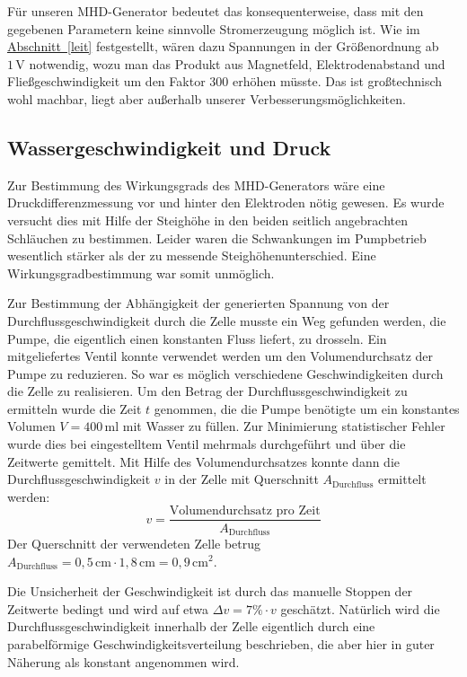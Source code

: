 \documentclass[11pt]{scrartcl}
\newcommand{\unit}[1]{\ensuremath{\,\mathrm{#1}}} %
\begin{document}
Für unseren MHD-Generator bedeutet das konsequenterweise, dass mit den gegebenen Parametern keine sinnvolle Stromerzeugung möglich ist. Wie im \hyperref[leit]{Abschnitt~\ref{leit}} festgestellt, wären dazu Spannungen in der Größenordnung ab $1\unit{V}$ notwendig, wozu man das Produkt aus Magnetfeld, Elektrodenabstand und Fließgeschwindigkeit um den Faktor 300 erhöhen müsste. Das ist großtechnisch wohl machbar, liegt aber außerhalb unserer Verbesserungsmöglichkeiten.




\subsection{Wassergeschwindigkeit und Druck}		%
Zur Bestimmung des Wirkungsgrads des MHD-Generators wäre eine Druckdifferenzmessung vor und hinter den Elektroden nötig gewesen.
Es wurde versucht dies mit Hilfe der Steighöhe in den beiden seitlich angebrachten Schläuchen zu bestimmen. Leider waren die Schwankungen im Pumpbetrieb wesentlich stärker als der zu messende Steighöhenunterschied.
Eine Wirkungsgradbestimmung war somit unmöglich.

Zur Bestimmung der Abhängigkeit der generierten Spannung von der Durchflussgeschwindigkeit durch die Zelle musste ein Weg gefunden werden, die Pumpe, die eigentlich einen konstanten Fluss liefert, zu drosseln.
Ein mitgeliefertes Ventil konnte verwendet werden um den Volumendurchsatz der Pumpe zu reduzieren. So war es möglich verschiedene Geschwindigkeiten durch die Zelle zu realisieren.
Um den Betrag der Durchflussgeschwindigkeit zu ermitteln wurde die Zeit $t$ genommen, die die Pumpe benötigte um ein konstantes Volumen $V=400\unit{ml}$ mit Wasser zu füllen. Zur Minimierung statistischer Fehler wurde dies bei eingestelltem Ventil mehrmals durchgeführt und über die Zeitwerte gemittelt.
Mit Hilfe des Volumendurchsatzes konnte dann die Durchflussgeschwindigkeit $v$ in der Zelle mit Querschnitt $A_{\text{Durchfluss}}$ ermittelt werden:
\begin{equation}
v=\frac{\text{Volumendurchsatz pro Zeit}}{A_{\text{Durchfluss}}}
\end{equation}
Der Querschnitt der verwendeten Zelle betrug $A_{\text{Durchfluss}}=0,5\unit{cm} \cdot 1,8\unit{cm}=0,9\unit{cm^{2}}$.

Die Unsicherheit der Geschwindigkeit ist durch das manuelle Stoppen der Zeitwerte bedingt und wird auf etwa $\Delta v=7\% \cdot v$ geschätzt.
Natürlich wird die Durchflussgeschwindigkeit innerhalb der Zelle eigentlich durch eine parabelförmige Geschwindigkeitsverteilung beschrieben, die aber hier in guter Näherung als konstant angenommen wird. 
\end{document}
